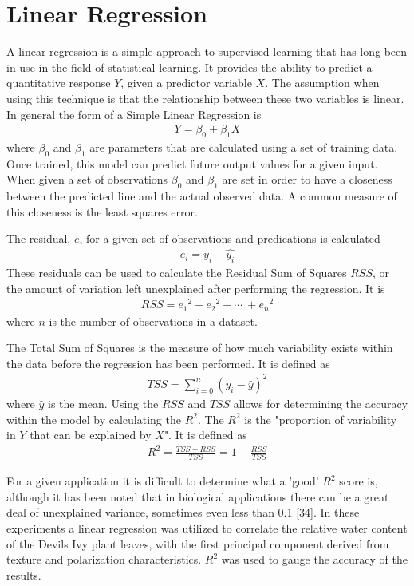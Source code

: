 \section{Linear Regression}
A linear regression is a simple approach to supervised learning that has long been in use in the field of statistical learning.  It provides the ability to predict a quantitative response $Y$, given a predictor variable $X$.  The assumption when using this technique is that the relationship between these two variables is linear.  In general the form of a Simple Linear Regression is
%
\begin{align}
    Y = \beta_0 + \beta_1 X
\end{align}
%
where $\beta_0$ and $\beta_1$ are parameters that are calculated using a set of training data.  Once trained, this model can predict future output values for a given input.  When given a set of observations $\beta_0$ and $\beta_1$ are set in order to have a closeness between the predicted line and the actual observed data.  A common measure of this closeness is the least squares error.

The residual, $e$, for a given set of observations and predications is calculated
%
\begin{align}
    e_i = y_i - \hat{y_i}
\end{align}
%
These residuals can be used to calculate the Residual Sum of Squares \(RSS\), or the amount of variation left unexplained after performing the regression.  It is
\begin{align}
    RSS = {e_1}^2 + {e_2}^2 + \cdots\ + {e_n}^2
\end{align}
where $n$ is the number of observations in a dataset.

The Total Sum of Squares is the measure of how much variability exists within the data before the regression has been performed.  It is defined as
\begin{align}
    TSS = \sum_{i=0}^n (y_i - \bar{y})^2
\end{align}
where $\bar{y}$ is the mean.  Using the $RSS$ and $TSS$ allows for determining the accuracy within the model by calculating the $R^2$.  The $R^2$ is the "proportion of variability in $Y$ that can be explained by $X$". It is defined as
\begin{align}
    R^2 = \frac{TSS - RSS}{TSS} = 1 - \frac{RSS}{TSS}
\end{align}

For a given application it is difficult to determine what a 'good' $R^2$ score is, although it has been noted that in biological applications there can be a great deal of unexplained variance, sometimes even less than 0.1 [34].  In these experiments a linear regression was utilized to correlate the relative water content of the Devils Ivy plant leaves, with the first principal component derived from texture and polarization characteristics.  $R^2$ was used to gauge the accuracy of the results.

